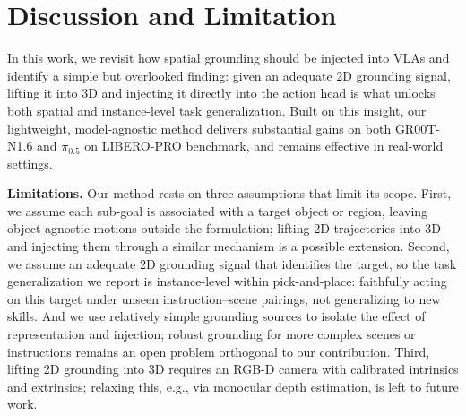 \section{Discussion and Limitation}
In this work, we revisit how spatial grounding should be injected into VLAs and identify a simple but overlooked finding: given an adequate 2D grounding signal, lifting it into 3D and injecting it directly into the action head is what unlocks both spatial and instance-level task generalization. Built on this insight, our lightweight, model-agnostic method delivers substantial gains on both GR00T-N1.6 and $\pi_{0.5}$ on LIBERO-PRO benchmark, and remains effective in real-world settings.

\textbf{Limitations.} Our method rests on three assumptions that limit its scope. First, we assume each sub-goal is associated with a target object or region, leaving object-agnostic motions outside the formulation; lifting 2D trajectories into 3D and injecting them through a similar mechanism is a possible extension. Second, we assume an adequate 2D grounding signal that identifies the target, so the task generalization we report is instance-level within pick-and-place: faithfully acting on this target under unseen instruction–scene pairings, not generalizing to new skills. And we use relatively simple grounding sources to isolate the effect of representation and injection; robust grounding for more complex scenes or instructions remains an open problem orthogonal to our contribution. Third, lifting 2D grounding into 3D requires an RGB-D camera with calibrated intrinsics and extrinsics; relaxing this, e.g., via monocular depth estimation, is left to future work.